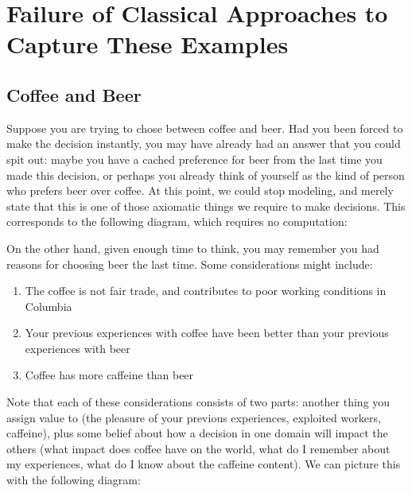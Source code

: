 \documentclass{article}
\theoremstyle{plain}
\theoremstyle{definition}
\theoremstyle{remark}
\newcommand\lab[1]{(#1)(lab-#1)}
\begin{document}
					

	\section{Failure of Classical Approaches to Capture These Examples}
	\subsection{Coffee and Beer}
	Suppose you are trying to chose between coffee and beer. Had you been forced to make the decision instantly, you may have already had an answer that you could spit out: maybe you have a cached preference for beer from the last time you made this decision, or perhaps you already think of yourself as the kind of person who prefers beer over coffee. At this point, we could stop modeling, and merely state that this is one of those axiomatic things we require to make decisions. This corresponds to the following diagram, which requires no computation:
	\begin{center}
	\end{center}
	
	
	On the other hand, given enough time to think, you may remember you had reasons for choosing beer the last time. Some considerations might include:
	\begin{enumerate}[nosep]
		\item The coffee is not fair trade, and contributes to poor working conditions in Columbia
		\item Your previous experiences with coffee have been better than your previous experiences with beer
		\item Coffee has more caffeine than beer	
	\end{enumerate}
	
	Note that each of these considerations consists of two parts: another thing you assign value to (the pleasure of your previous experiences, exploited workers, caffeine), plus some belief about how a decision in one domain will impact the others (what impact does coffee have on the world, what do I remember about my experiences, what do I know about the caffeine content). We can picture this with the following diagram:
	
\end{document}

